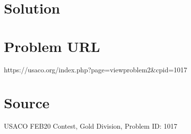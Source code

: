 \documentclass[12pt]{article}
\begin{document}
\section*{Solution}


\section*{Problem URL}
https://usaco.org/index.php?page=viewproblem2&cpid=1017

\section*{Source}
USACO FEB20 Contest, Gold Division, Problem ID: 1017
\end{document}
